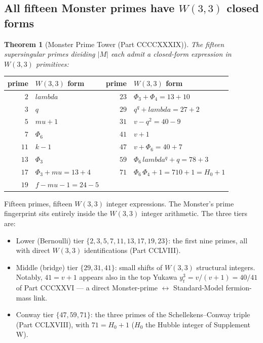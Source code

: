 \documentclass[11pt]{article}
\def\mathbb#1{#1}%
\def\textbf#1{#1}%
\def\lambda{lambda}%
\def\mu{mu}%
\def\Phi#1{Phi#1}%
\def\cdot{ }%
\newtheorem*{theorem}{Theorem}
\begin{document}
\subsection*{All fifteen Monster primes have $W(3,3)$ closed forms}

\begin{theorem}[Monster Prime Tower (Part CCCCXXXIX)]
The fifteen supersingular primes dividing $|\mathbb{M}|$ each admit a closed-form expression in $W(3,3)$ primitives:
\end{theorem}

\begin{center}
\renewcommand{\arraystretch}{1.2}
\begin{tabular}{r l r l}
\toprule
prime & $W(3,3)$ form & prime & $W(3,3)$ form \\
\midrule
$2$ & $\lambda$ & $23$ & $\Phi_3 + \Phi_4 = 13 + 10$ \\
$3$ & $q$ & $29$ & $q^q + \lambda = 27 + 2$ \\
$5$ & $\mu + 1$ & $31$ & $v - q^2 = 40 - 9$ \\
$7$ & $\Phi_6$ & $41$ & $v + 1$ \\
$11$ & $k - 1$ & $47$ & $v + \Phi_6 = 40 + 7$ \\
$13$ & $\Phi_3$ & $59$ & $\Phi_6\,\lambda^q + q = 7\cdot 8 + 3$ \\
$17$ & $\Phi_3 + \mu = 13 + 4$ & $71$ & $\Phi_6\,\Phi_4 + 1 = 7\cdot 10 + 1 = H_0 + 1$ \\
$19$ & $f - \mu - 1 = 24 - 5$ & & \\
\bottomrule
\end{tabular}
\end{center}

\textbf{Fifteen primes, fifteen $W(3,3)$ integer expressions.} The Monster's prime fingerprint sits entirely inside the $W(3,3)$ integer arithmetic. The three tiers are:
\begin{itemize}[leftmargin=2em]
\item \textbf{Lower (Bernoulli) tier} $\{2,3,5,7,11,13,17,19,23\}$: the first nine primes, all with direct $W(3,3)$ identifications (Part CCLVIII).
\item \textbf{Middle (bridge) tier} $\{29,31,41\}$: small shifts of $W(3,3)$ structural integers. Notably, $41 = v + 1$ appears also in the top Yukawa $y_t^3 = v/(v+1) = 40/41$ of Part CCCXXVI --- a direct Monster-prime $\leftrightarrow$ Standard-Model fermion-mass link.
\item \textbf{Conway tier} $\{47, 59, 71\}$: the three primes of the Schellekens--Conway triple (Part CCLXVIII), with $71 = H_0 + 1$ ($H_0$ the Hubble integer of Supplement W).
\end{itemize}
\end{document}
